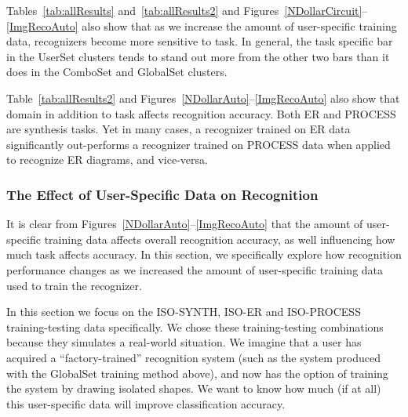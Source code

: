 \documentclass[final,5p,twocolumn]{elsarticle}
\begin{document}
Tables~\ref{tab:allResults}
and~\ref{tab:allResults2} and Figures~\ref{NDollarCircuit}--\ref{ImgRecoAuto}
also show that as we increase the amount of user-specific training data, 
recognizers become more sensitive to task.  In general, the task specific bar
in the UserSet clusters tends to stand out more from the other two bars than it 
does in the ComboSet and GlobalSet clusters.  

Table~\ref{tab:allResults2} and Figures~\ref{NDollarAuto}--\ref{ImgRecoAuto} also 
show that domain in addition to task affects recognition accuracy.  Both ER
and PROCESS are synthesis tasks.  Yet in many cases, a recognizer trained on ER
data significantly out-performs a recognizer trained on PROCESS data when applied
to recognize ER diagrams, and vice-versa.


\subsubsection{The Effect of User-Specific Data on Recognition}
\label{userExperiment}
It is clear from Figures~\ref{NDollarAuto}--\ref{ImgRecoAuto} that the 
amount of user-specific training data affects overall recognition accuracy, 
as well influencing how much task affects accuracy.  In this section, we specifically 
explore how recognition performance changes as
we increased the amount of user-specific training data used to train
the recognizer.


In this section we focus on the ISO-SYNTH, ISO-ER and ISO-PROCESS training-testing data specifically.  
We chose these training-testing combinations because they simulates a real-world 
situation.  We imagine that a user has acquired a ``factory-trained'' recognition system (such
as the system produced with the GlobalSet training method above), and now has the
option of training the system by drawing isolated shapes.  We want to
know how much (if at all) this user-specific data will improve
classification accuracy.
\end{document}
